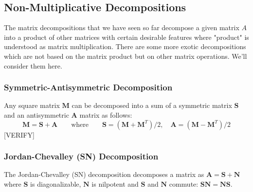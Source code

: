 \subsection{Non-Multiplicative Decompositions}
The matrix decompositions that we have seen so far decompose a given matrix $A$ into a product of other matrices with certain desirable features where "product" is understood as matrix multiplication. There are some more exotic decompositions which are not based on the matrix product but on other matrix operations. We'll consider them here.

\subsubsection{Symmetric-Antisymmetric Decomposition}
Any square matrix $\mathbf{M}$ can be decomposed into a sum of a symmetric matrix $\mathbf{S}$ and an antisymmetric $\mathbf{A}$ matrix as follows:
\begin{equation}
\mathbf{M} = \mathbf{S + A} \qquad \text{where}  \qquad
\mathbf{S} = (\mathbf{M} + \mathbf{M}^T) / 2,  \quad
\mathbf{A} = (\mathbf{M} - \mathbf{M}^T) / 2
\end{equation}
[VERIFY]




\subsubsection{Jordan-Chevalley (SN) Decomposition}
The Jordan-Chevalley (SN) decomposition decomposes a matrix as $\mathbf{A} =  \mathbf{S + N}$ where $\mathbf{S}$ is diagonalizable, $\mathbf{N}$ is nilpotent and $\mathbf{S}$ and $\mathbf{N}$ commute:
$\mathbf{SN} = \mathbf{NS}$.


